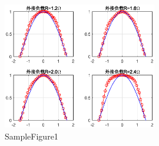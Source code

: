{\begin{spacing}{1.5}
\begin{figure}[htbp]
	\centering
	\includegraphics[width=0.6\textwidth, trim=0 20 0 0,clip]{figure//fig_calculate}
	\caption{SampleFigure1}\label{samplefigure1}
\end{figure}


\end{spacing}}
